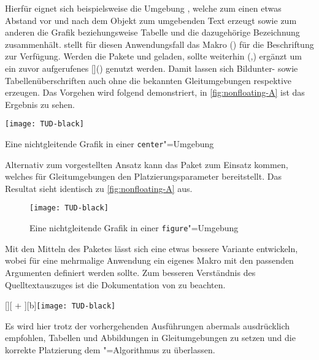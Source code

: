 \documentclass[%
  english,ngerman,%
  cdgeometry=no,DIV=12,automark,%
]{tudscrartcl}
\begin{document}
Hierfür eignet sich beispielsweise die Umgebung , welche 
zum einen etwas Abstand vor und nach dem Objekt zum umgebenden Text erzeugt 
sowie zum anderen die Grafik beziehungsweise Tabelle und die dazugehörige 
Bezeichnung zusammenhält. \KOMAScript stellt für diesen Anwendungsfall das 
Makro () für die Beschriftung zur 
Verfügung. Werden die Pakete  und  geladen, 
sollte weiterhin (,) 
ergänzt um ein zuvor aufgerufenes  
[]()
genutzt werden. Damit lassen sich Bildunter- sowie Tabellenüberschriften auch 
ohne die bekannten Gleitumgebungen  respektive 
 erzeugen. Das Vorgehen wird folgend demonstriert, in 
\autoref{fig:nonfloating-A} ist das Ergebnis zu sehen.
%
\begin{Hint}
\begin{center}
\captionsetup{type=figure}
\texttt{[image: TUD-black]}
\caption{Eine nichtgleitende Grafik in einer \texttt{center}"=Umgebung}
\label{fig:nonfloating-A}
\end{center}

\end{Hint}
\InputCode\noindent
%
Alternativ zum vorgestellten Ansatz kann das Paket  zum Einsatz 
kommen, welches für Gleitumgebungen den Platzierungsparameter  
bereitstellt. Das Resultat sieht identisch zu \autoref{fig:nonfloating-A} aus.
%
\begin{Hint}
\begin{figure}[H]
\texttt{[image: TUD-black]}
\caption{Eine nichtgleitende Grafik in einer \texttt{figure}"=Umgebung}
\label{fig:...}
\end{figure}

\end{Hint}
%
Mit den Mitteln des Paketes  lässt sich eine etwas bessere 
Variante entwickeln, wobei für eine mehrmalige Anwendung ein eigenes Makro mit 
den passenden Argumenten definiert werden sollte. Zum besseren Verständnis des 
Quelltextauszuges ist die Dokumentation von  zu beachten.
%
\begin{Hint}
[\FBwidth][%
  \dimexpr\FBheight+\abovedisplayskip\relax%
][b]{\texttt{[image: TUD-black]}}{%
  \caption{%
    Eine nichtgleitende Grafik mit \texttt{\textbackslash floatbox}%
  }%
  \label{fig:nonfloating-B}%
}
\end{Hint}
\InputCode\noindent
%
Es wird hier trotz der vorhergehenden Ausführungen abermals ausdrücklich 
empfohlen, Tabellen und Abbildungen in Gleitumgebungen zu setzen und die 
korrekte Platzierung dem "=Algorithmus zu überlassen.
\end{document}
